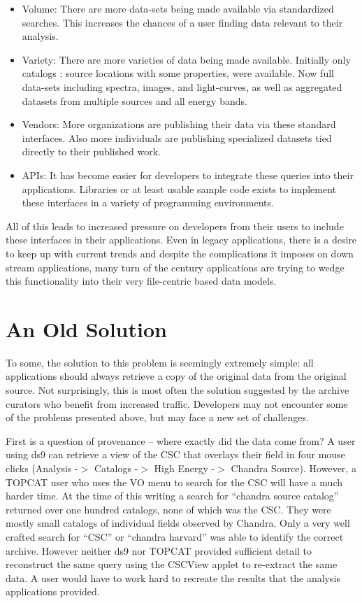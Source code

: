 \begin{itemize}

\item Volume: There are more data-sets being made available via standardized searches. This increases the chances of a user finding data relevant to their analysis. 
\item Variety:  There are more varieties of data being made available.  Initially only catalogs : source locations with some properties, were available.  Now full data-sets including spectra, images, and light-curves, as well as aggregated
datasets from multiple sources and all energy bands.
\item Vendors: More organizations are publishing their data via these 
standard interfaces.  Also more individuals are publishing specialized datasets tied directly 
to their published work.
\item APIs: It has become easier for developers to integrate these queries into their applications.  Libraries or at least usable sample code exists to implement these interfaces in a variety of programming environments.

\end{itemize}

All of this leads to increased pressure on developers  from their users to
 include these interfaces in their applications.    Even in legacy applications, there is a desire to keep up with current trends and despite the 
complications it imposes on down stream applications, many turn
of the century applications are trying to wedge this functionality into
their very file-centric based data models.



\section{An Old Solution}

To some, the solution to this problem is seemingly extremely simple:  all 
applications should always retrieve a copy of the original data from the 
original source.  Not surprisingly, this is most often the solution 
suggested by the archive curators who benefit from increased traffic. 
Developers may not encounter some of the problems presented 
above, but may face a new set of challenges.


First is a question of provenance -- where exactly did the data come from?
A user using ds9 can retrieve a view of the CSC that overlays their field in
four mouse clicks  (Analysis -$>$ Catalogs -$>$ High Energy -$>$ Chandra Source).
However, a TOPCAT user who uses the VO menu to search for the CSC will have
a much harder time.  At the time of this writing a search for
 ``chandra source catalog'' returned over one hundred catalogs, none of
which was the CSC.  They were mostly small catalogs of individual fields 
observed by Chandra.  Only a very well crafted search for ``CSC'' or ``chandra harvard'' was able to identify the correct archive.  However neither ds9
nor TOPCAT provided sufficient detail to reconstruct the same query using
the CSCView applet to re-extract the same data.  A user would have to work
hard to recreate the results that the analysis applications provided.

